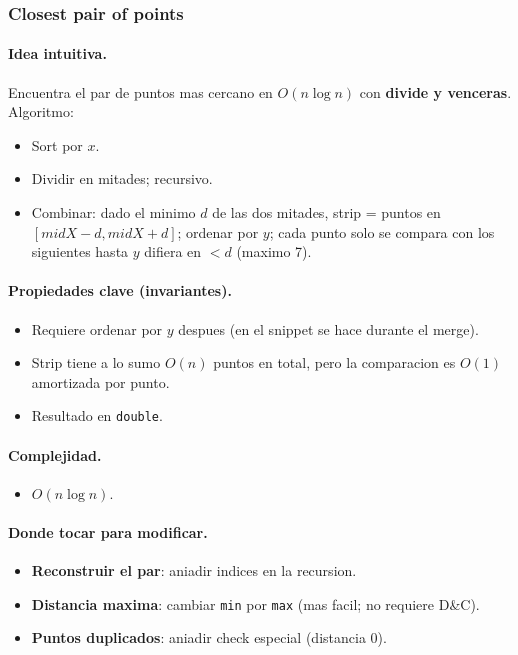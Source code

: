 ﻿\subsubsection{Closest pair of points}

\paragraph{Idea intuitiva.}
Encuentra el par de puntos mas cercano en $O(n \log n)$ con \textbf{divide y venceras}. Algoritmo:
\begin{itemize}\setlength\itemsep{0pt}
	\item Sort por $x$.
	\item Dividir en mitades; recursivo.
	\item Combinar: dado el minimo $d$ de las dos mitades, strip = puntos en $[midX - d, midX + d]$; ordenar por $y$; cada punto solo se compara con los siguientes hasta $y$ difiera en $< d$ (maximo 7).
\end{itemize}

\paragraph{Propiedades clave (invariantes).}
\begin{itemize}\setlength\itemsep{0pt}
	\item Requiere ordenar por $y$ despues (en el snippet se hace durante el merge).
	\item Strip tiene a lo sumo $O(n)$ puntos en total, pero la comparacion es $O(1)$ amortizada por punto.
	\item Resultado en \texttt{double}.
\end{itemize}

\paragraph{Complejidad.}
\begin{itemize}\setlength\itemsep{0pt}
	\item $O(n \log n)$.
\end{itemize}

\paragraph{Donde tocar para modificar.}
\begin{itemize}\setlength\itemsep{0pt}
	\item \textbf{Reconstruir el par}: aniadir indices en la recursion.
	\item \textbf{Distancia maxima}: cambiar \texttt{min} por \texttt{max} (mas facil; no requiere D\&C).
	\item \textbf{Puntos duplicados}: aniadir check especial (distancia 0).
\end{itemize}

